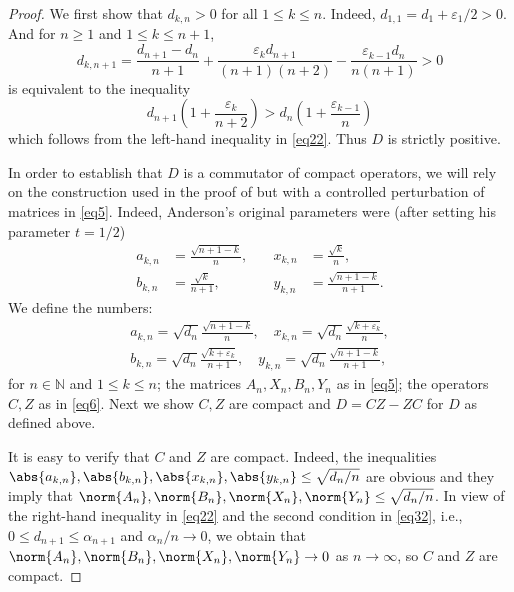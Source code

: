 \documentclass[10pt,reqno]{amsart}
\theoremstyle{remark}
\numberwithin{equation}{section}
\begin{document}
\begin{proof}
  We first show that $d_{k,n}>0$ for all $1 \le k \le n$.
  Indeed, $d_{1,1}=d_1 + \varepsilon_1/2 > 0$.
  And for $n\ge 1$ and $1 \le k \le n+1$,
  \begin{equation*}
    d_{k,n+1}=\frac{d_{n+1}-d_n}{n+1}+\frac{\varepsilon_k d_{n+1}}{(n+1)(n+2)}-\frac{\varepsilon_{k-1} d_n}{n(n+1)}>0
  \end{equation*}
  is equivalent to the inequality
  \begin{equation*}
    d_{n+1}\left(1+\frac{\varepsilon_k}{n+2}\right)> d_n\left(1+\frac{\varepsilon_{k-1}}{n}\right)
  \end{equation*}
  which follows from the left-hand inequality in \eqref{eq22}.
  Thus $D$ is strictly positive.

  In order to establish that $D$ is a commutator of compact operators, we will rely on the construction used in the proof of  but with a controlled perturbation of matrices in \eqref{eq5}.
  Indeed, Anderson's original parameters were (after setting his parameter $t=1/2$)
  \begin{equation*}%
    \begin{aligned}
      a_{k,n}&=\frac{\sqrt{n+1-k}}{n},\\
      b_{k,n}&=\frac{\sqrt{k}}{n+1},
    \end{aligned}
    \quad \begin{aligned}
      x_{k,n}&=\frac{\sqrt{k}}{n}, \\
      y_{k,n}&=\frac{\sqrt{n+1-k}}{n+1}.
    \end{aligned}
  \end{equation*}
  We define the numbers:
  \begin{equation}
    \label{eq2}
    \begin{gathered}
      a_{k,n}=\sqrt{d_n}\frac{\sqrt{n+1-k}}{n},\quad x_{k,n}=\sqrt{d_n}\frac{\sqrt{k+\varepsilon_k}}{n}, \\
      b_{k,n}=\sqrt{d_n}\frac{\sqrt{k+\varepsilon_k}}{n+1}, \quad
      y_{k,n}=\sqrt{d_n}\frac{\sqrt{n+1-k}}{n+1},
    \end{gathered}
  \end{equation}
  for $n\in\mathbb{N}$ and $1\le k\le n$;
  the matrices $A_n,X_n, B_n,Y_n$ as in \eqref{eq5};
  the operators $C,Z$ as in \eqref{eq6}.
  Next we show $C,Z$ are compact and $D=CZ-ZC$ for $D$ as defined above.



  It is easy to verify that $C$ and $Z$ are compact.
  Indeed, the inequalities $\abs{a_{k,n}},\abs{b_{k,n}},\abs{x_{k,n}},\abs{y_{k,n}}\le \sqrt{d_n/n}$ are obvious and they imply that $\norm{A_n},\norm{B_n},\norm{X_n},\norm{Y_n}\le \sqrt{d_n/n}$.
  In view of the right-hand inequality in \eqref{eq22} and the second condition in \eqref{eq32}, i.e., $0\le d_{n+1}\le \alpha_{n+1}$ and $\alpha_n/n\to 0$, we obtain that $\norm{A_n},\norm{B_n},\norm{X_n},\norm{Y_n}\to 0$ as $n\to\infty$, so $C$ and $Z$ are compact.


\end{proof}
\end{document}
